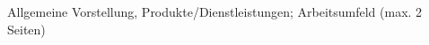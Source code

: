 \documentclass[crop=false]{standalone}
\begin{document}
Allgemeine Vorstellung, Produkte/Dienstleistungen; Arbeitsumfeld (max. 2 Seiten) 
\end{document}
